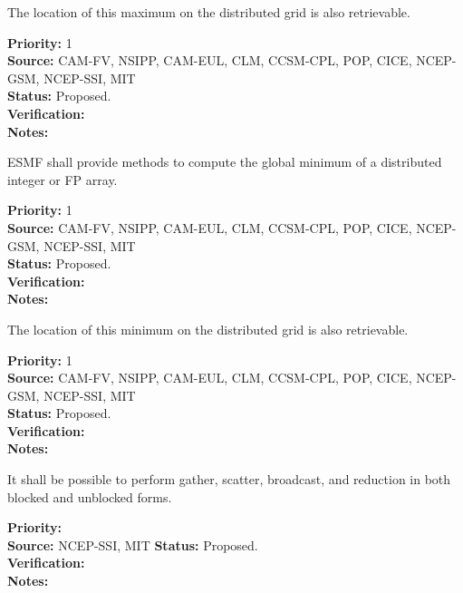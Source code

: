 
The location of this maximum on the distributed grid is also
retrievable.

\begin{reqlist}
{\bf Priority:} 1\\ 
{\bf Source:} CAM-FV, NSIPP, CAM-EUL, CLM, CCSM-CPL, POP, CICE, NCEP-GSM, NCEP-SSI, MIT \\
{\bf Status:} Proposed. \\
{\bf Verification:} \\
{\bf Notes:}
\end{reqlist}



ESMF shall provide methods to compute the global minimum of a
distributed integer or FP array.

\begin{reqlist}
{\bf Priority:} 1\\ 
{\bf Source:} CAM-FV, NSIPP, CAM-EUL, CLM, CCSM-CPL, POP, CICE, NCEP-GSM, NCEP-SSI, MIT \\
{\bf Status:} Proposed. \\
{\bf Verification:} \\
{\bf Notes:}
\end{reqlist}



The location of this minimum on the distributed grid is also
retrievable.

\begin{reqlist}
{\bf Priority:} 1 \\ 
{\bf Source:} CAM-FV, NSIPP, CAM-EUL, CLM, CCSM-CPL, POP, CICE, NCEP-GSM, NCEP-SSI, MIT \\
{\bf Status:} Proposed. \\
{\bf Verification:} \\
{\bf Notes:}
\end{reqlist}


It shall be possible to perform gather, scatter, broadcast, and reduction in both blocked and unblocked forms.

\begin{reqlist}
{\bf Priority:} \\ 
{\bf Source:} NCEP-SSI, MIT
{\bf Status:} Proposed. \\
{\bf Verification:} \\
{\bf Notes:} 
\end{reqlist}

